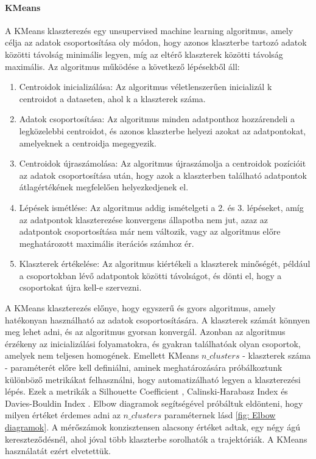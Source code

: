 \documentclass[acmtog, authorversion]{acmart}
\begin{document}
\paragraph{KMeans} A KMeans klaszterezés egy unsupervised machine learning algoritmus, amely célja az adatok csoportosítása oly módon, hogy azonos klaszterbe tartozó adatok közötti távolság minimális legyen, míg az eltérő klaszterek közötti távolság maximális.
Az algoritmus működése a következő lépésekből áll:
\begin{enumerate}
    \item Centroidok inicializálása: Az algoritmus véletlenszerűen inicializál k centroidot a dataseten, ahol k a klaszterek száma.
    \item Adatok csoportosítása: Az algoritmus minden adatponthoz hozzárendeli a legközelebbi centroidot, és azonos klaszterbe helyezi azokat az adatpontokat, amelyeknek a centroidja megegyezik.
    \item Centroidok újraszámolása: Az algoritmus újraszámolja a centroidok pozícióit az adatok csoportosítása után, hogy azok a klaszterben található adatpontok átlagértékének megfelelően helyezkedjenek el.
    \item Lépések ismétlése: Az algoritmus addig ismételgeti a 2. és 3. lépéseket, amíg az adatpontok klaszterezése konvergens állapotba nem jut, azaz az adatpontok csoportosítása már nem változik, vagy az algoritmus előre meghatározott maximális iterációs számhoz ér.
    \item Klaszterek értékelése: Az algoritmus kiértékeli a klaszterek minőségét, például a csoportokban lévő adatpontok közötti távolságot, és dönti el, hogy a csoportokat újra kell-e szervezni.
\end{enumerate}
A KMeans klaszterezés előnye, hogy egyszerű és gyors algoritmus, amely hatékonyan használható az adatok csoportosítására. A klaszterek számát könnyen meg lehet adni, és az algoritmus gyorsan konvergál. Azonban az algoritmus érzékeny az inicializálási folyamatokra, és gyakran találhatóak olyan csoportok, amelyek nem teljesen homogének.
Emellett KMeans $n\_clusters$ - klaszterek száma - paraméterét előre kell definiálni, aminek meghatározására próbálkoztunk különböző metrikákat felhasználni, hogy automatizálható legyen
a klaszterezési lépés. Ezek a metrikák a Silhouette Coefficient \cite{ROUSSEEUW198753}, Calinski-Harabasz Index \cite{article} és Davies-Bouldin Index \cite{4766909}.
Elbow diagramok segítségével próbáltuk eldönteni, hogy milyen értéket érdemes adni az \begin{math}n\_clusters\end{math} paraméternek lásd \ref{fig: Elbow diagramok}.
A mérőszámok konzisztensen alacsony értéket adtak, egy négy ágú kereszteződésnél, ahol jóval több klaszterbe sorolhatók a trajektóriák. A KMeans használatát
ezért elvetettük.
\end{document}
